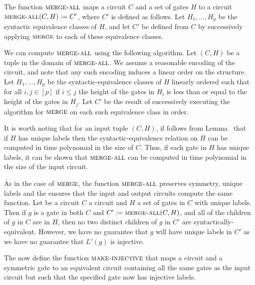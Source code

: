 \documentclass[../paper.tex]{subfiles}
\begin{document}
\begin{definition}
  \label{def:merge-all}
  The function ${\normalfont\textsc{merge-all}}$ maps a circuit $C$ and a set of gates $H$ to a
  circuit ${\normalfont\textsc{merge-all}}(C, H) := C'$, where $C'$ is defined as follows. Let
  $H_1, \ldots, H_p$ be the syntactic equivalence classes of $H$, and let $C'$
  be defined from $C$ by successively applying ${\normalfont\textsc{merge}}$ to each of these
  equivalence classes.
\end{definition}

We can compute ${\normalfont\textsc{merge-all}}$ using the following algorithm. Let $(C, H)$ be a
tuple in the domain of ${\normalfont\textsc{merge-all}}$. We assume a reasonable encoding of the
circuit, and note that any such encoding induces a linear order on the
structure. Let $H_1, \ldots, H_p$ be the syntactic-equivalence classes of $H$
linearly ordered such that for all $i, j \in [p]$ if $i \leq j$ the height of
the gates in $H_i$ is less than or equal to the height of the gates in $H_j$.
Let $C'$ be the result of successively executing the algorithm for ${\normalfont\textsc{merge}}$
on each such equivalence class in order.

It is worth noting that for an input tuple $(C, H)$, if follows from
Lemma~\cite{lem:unique-labels-syntactic-equiv} that if $H$ has unique labels
then the syntactic-equivalence relation on $H$ can be computed in time
polynomial in the size of $C$. Thus, if each gate in $H$ has unique labels, it
can be shown that ${\normalfont\textsc{merge-all}}$ can be computed in time polynomial in the
size of the input circuit.

As in the case of ${\normalfont\textsc{merge}}$, the function ${\normalfont\textsc{merge-all}}$ preserves
symmetry, unique labels and the ensures that the input and output circuits
compute the same function. Let be a circuit $C$ a circuit and $H$ a set of gates
in $C$ with unique labels. Then if $g$ is a gate in both $C$ and $C' :=
{\normalfont\textsc{merge-all}}(C, H)$, and all of the children of $g$ in $C$ are in $H$, then no
two distinct children of $g$ in $C'$ are syntactically-equivalent. However, we
have no guarantee that $g$ will have unique labels in $C'$ as we have no
guarantee that $L'(g)$ is injective.

The now define the function ${\normalfont\textsc{make-injective}}$ that maps a circuit and a
symmetric gate to an equivalent circuit containing all the same gates as the
input circuit but such that the specified gate now has injective labels.
\end{document}

